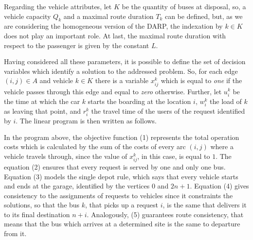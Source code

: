 \documentclass[tuberlin,cic,tc,openright,english,noabntcite,oneside]{iiufrgs}
\begin{document}
Regarding the vehicle attributes, let $K$ be the quantity of buses at disposal, so, a vehicle capacity $Q_{k}$ and a maximal route duration $T_{k}$ can be defined, but, as we are considering the homogeneous version of the DARP, the indexation by $k \in K$ does not play an important role. At last, the maximal route duration with respect to the passenger is given by the constant $L$.

Having considered all these parameters, it is possible to define the set of decision variables which identify a solution to the addressed problem. So, for each edge $(i,j) \in A$ and vehicle $k \in K$ there is a variable $x_{ij}^k$ which is equal to \emph{one} if the vehicle passes through this edge and equal to \emph{zero} otherwise. Further, let $u_i^k$ be the time at which the car $k$ starts the boarding at the location $i$, $w_i^k$ the load of $k$ as leaving that point, and $r_i^k$ the travel time of the users of the request identified by $i$. The linear program is then written as follows.

In the program above, the objective function (1) represents the total operation costs which is calculated by the sum of the costs of every arc $(i,j)$ where a vehicle travels through, since the value of $x_{ij}^k$, in this case, is equal to $1$. The equation (2) ensures that every request is served by one and only one bus. Equation (3) models the single depot rule, which says that every vehicle starts and ends at the garage, identified by the vertices $0$ and $2n+1$. Equation (4) gives consistency to the assignments of requests to vehicles since it constraints the solutions, so that the bus $k$, that picks up a request $i$, is the same that delivers it to its final destination $n+i$. Analogously, (5) guarantees route consistency, that means that the bus which arrives at a determined site is the same to departure from it.
\end{document}
